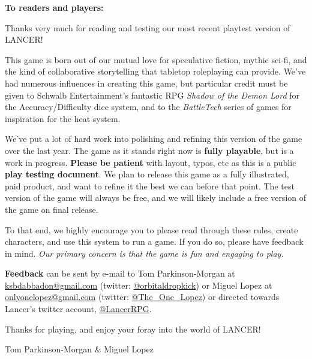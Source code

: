 \textbf{To readers and players:}

Thanks very much for reading and testing our most recent playtest version of LANCER!

This game is born out of our mutual love for speculative fiction, mythic sci-fi, and the kind of
collaborative storytelling that tabletop roleplaying can provide. We’ve had numerous influences in
creating this game, but particular credit must be given to Schwalb Entertainment’s fantastic RPG
\textit{Shadow of the Demon Lord} for the Accuracy/Difficulty dice system, and to the \textit{BattleTech} series of
games for inspiration for the heat system.

We’ve put a lot of hard work into polishing and refining this version of the game over the last year.
The game as it stands right now is \textbf{fully playable}, but is a work in progress. \textbf{Please be patient}
with layout, typos, etc as this is a public \textbf{play testing document}. We plan to release this game as
a fully illustrated, paid product, and want to refine it the best we can before that point. The test
version of the game will always be free, and we will likely include a free version of the game on
final release.

To that end, we highly encourage you to please read through these rules, create characters, and
use this system to run a game. If you do so, please have feedback in mind. \textit{Our primary concern
is that the game is fun and engaging to play.}

\textbf{Feedback} can be sent by e-mail to Tom Parkinson-Morgan at \href{mailto:ksbdabbadon@gmail.com}{ksbdabbadon@gmail.com} (twitter:
\href{https://twitter.com/Orbitaldropkick}{@orbitaldropkick}) or Miguel Lopez at \href{mailto:onlyonelopez@gmail.com}{onlyonelopez@gmail.com} (twitter: \href{https://twitter.com/The_One_Lopez}{@The\_One\_Lopez}) or
directed towards Lancer’s twitter account, \href{https://twitter.com/Lancer_RPG}{@LancerRPG}.

Thanks for playing, and enjoy your foray into the world of LANCER!

\quad Tom Parkinson-Morgan \& Miguel Lopez




